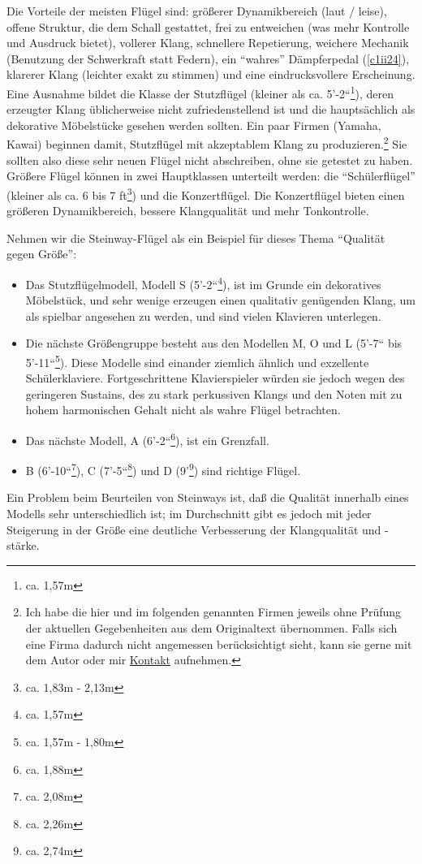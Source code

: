 Die Vorteile der meisten Flügel sind: größerer Dynamikbereich (laut / leise), offene Struktur, die dem Schall gestattet, frei zu entweichen (was mehr Kontrolle und Ausdruck bietet), vollerer Klang, schnellere Repetierung, weichere Mechanik (Benutzung der Schwerkraft statt Federn), ein \enquote{wahres} Dämpferpedal (\hyperref[c1ii24]{\autoref{c1ii24}}), klarerer Klang (leichter exakt zu stimmen) und eine eindrucksvollere Erscheinung.
Eine Ausnahme bildet die Klasse der Stutzflügel (kleiner als ca. 5'-2``\footnote{ca. 1,57m}), deren erzeugter Klang üblicherweise nicht zufriedenstellend ist und die hauptsächlich als dekorative Möbelstücke gesehen werden sollten.
Ein paar Firmen (Yamaha, Kawai) beginnen damit, Stutzflügel mit akzeptablem Klang zu produzieren.\footnote{Ich habe die hier und im folgenden genannten Firmen jeweils ohne Prüfung der aktuellen Gegebenheiten aus dem Originaltext übernommen.
Falls sich eine Firma dadurch nicht angemessen berücksichtigt sieht, kann sie gerne mit dem Autor oder mir \hyperref[kontakt]{Kontakt} aufnehmen.}
Sie sollten also diese sehr neuen Flügel nicht abschreiben, ohne sie getestet zu haben.
Größere Flügel können in zwei Hauptklassen unterteilt werden: die \enquote{Schülerflügel}  (kleiner als ca. 6 bis 7 ft\footnote{ca. 1,83m - 2,13m}) und die Konzertflügel.
Die Konzertflügel bieten einen größeren Dynamikbereich, bessere Klangqualität und mehr Tonkontrolle.

Nehmen wir die Steinway-Flügel als ein Beispiel für dieses Thema \enquote{Qualität gegen Größe}:

\begin{itemize} 
\item Das Stutzflügelmodell, Modell S (5'-2``\footnote{ca. 1,57m}), ist im Grunde ein dekoratives Möbelstück, und sehr wenige erzeugen einen qualitativ genügenden Klang, um als spielbar angesehen zu werden, und sind vielen Klavieren unterlegen.
\item Die nächste Größengruppe besteht aus den Modellen M, O und L (5'-7`` bis 5'-11``\footnote{ca. 1,57m - 1,80m}).
Diese Modelle sind einander ziemlich ähnlich und exzellente Schülerklaviere.
Fortgeschrittene Klavierspieler würden sie jedoch wegen des geringeren Sustains, des zu stark perkussiven Klangs und den Noten mit zu hohem harmonischen Gehalt nicht als wahre Flügel betrachten.
\item Das nächste Modell, A (6'-2``\footnote{ca. 1,88m}), ist ein Grenzfall.
\item B (6'-10``\footnote{ca. 2,08m}), C (7'-5``\footnote{ca. 2,26m}) und D (9'\footnote{ca. 2,74m}) sind richtige Flügel.
 \end{itemize}
Ein Problem beim Beurteilen von Steinways ist, daß die Qualität innerhalb eines Modells sehr unterschiedlich ist; im Durchschnitt gibt es jedoch mit jeder Steigerung in der Größe eine deutliche Verbesserung der Klangqualität und -stärke.

